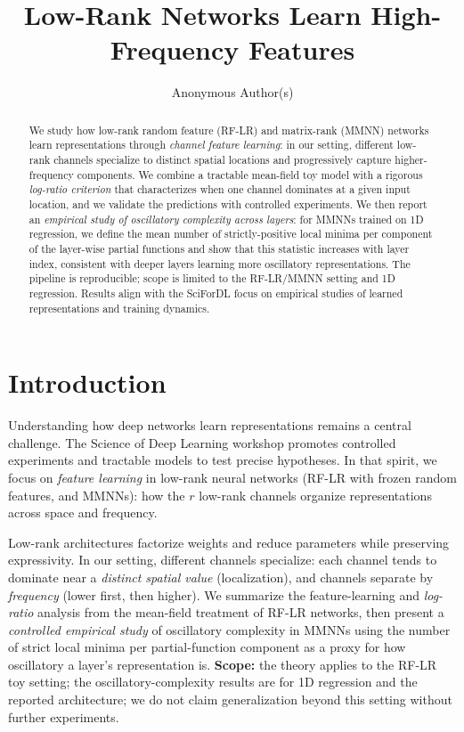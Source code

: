 \documentclass{article}
\title{Low-Rank Networks Learn High-Frequency Features}
\author{Anonymous Author(s)
}
\theoremstyle{plain}
\theoremstyle{definition}
\begin{document}
\maketitle

\begin{abstract}
We study how low-rank random feature (RF-LR) and matrix-rank (MMNN) networks learn representations through \emph{channel feature learning}: in our setting, different low-rank channels specialize to distinct spatial locations and progressively capture higher-frequency components. We combine a tractable mean-field toy model with a rigorous \emph{log-ratio criterion} that characterizes when one channel dominates at a given input location, and we validate the predictions with controlled experiments. We then report an \emph{empirical study of oscillatory complexity across layers}: for MMNNs trained on 1D regression, we define the mean number of strictly-positive local minima per component of the layer-wise partial functions and show that this statistic increases with layer index, consistent with deeper layers learning more oscillatory representations. The pipeline is reproducible; scope is limited to the RF-LR/MMNN setting and 1D regression. Results align with the SciForDL focus on empirical studies of learned representations and training dynamics.
\end{abstract}

\section{Introduction}
\label{sec:intro}

Understanding how deep networks learn representations remains a central challenge. The Science of Deep Learning workshop promotes controlled experiments and tractable models to test precise hypotheses. In that spirit, we focus on \emph{feature learning} in low-rank neural networks (RF-LR with frozen random features, and MMNNs): how the $r$ low-rank channels organize representations across space and frequency.

Low-rank architectures factorize weights and reduce parameters while preserving expressivity. In our setting, different channels specialize: each channel tends to dominate near a \emph{distinct spatial value} (localization), and channels separate by \emph{frequency} (lower first, then higher). We summarize the feature-learning and \emph{log-ratio} analysis from the mean-field treatment of RF-LR networks, then present a \emph{controlled empirical study} of oscillatory complexity in MMNNs using the number of strict local minima per partial-function component as a proxy for how oscillatory a layer's representation is. \textbf{Scope:} the theory applies to the RF-LR toy setting; the oscillatory-complexity results are for 1D regression and the reported architecture; we do not claim generalization beyond this setting without further experiments.
\end{document}
